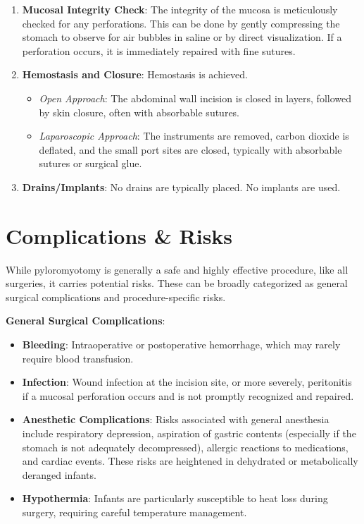 \begin{enumerate}
  \item \textbf{Mucosal Integrity Check}: The integrity of the mucosa is meticulously checked for any perforations. This can be done by gently compressing the stomach to observe for air bubbles in saline or by direct visualization. If a perforation occurs, it is immediately repaired with fine sutures.
  \item \textbf{Hemostasis and Closure}: Hemostasis is achieved.
    \begin{itemize}
      \item \textit{Open Approach}: The abdominal wall incision is closed in layers, followed by skin closure, often with absorbable sutures.
      \item \textit{Laparoscopic Approach}: The instruments are removed, carbon dioxide is deflated, and the small port sites are closed, typically with absorbable sutures or surgical glue.
    \end{itemize}
  \item \textbf{Drains/Implants}: No drains are typically placed. No implants are used.
\end{enumerate}

\section*{Complications \& Risks}
While pyloromyotomy is generally a safe and highly effective procedure, like all surgeries, it carries potential risks. These can be broadly categorized as general surgical complications and procedure-specific risks.

\textbf{General Surgical Complications}:
\begin{itemize}
  \item \textbf{Bleeding}: Intraoperative or postoperative hemorrhage, which may rarely require blood transfusion.
  \item \textbf{Infection}: Wound infection at the incision site, or more severely, peritonitis if a mucosal perforation occurs and is not promptly recognized and repaired.
  \item \textbf{Anesthetic Complications}: Risks associated with general anesthesia include respiratory depression, aspiration of gastric contents (especially if the stomach is not adequately decompressed), allergic reactions to medications, and cardiac events. These risks are heightened in dehydrated or metabolically deranged infants.
  \item \textbf{Hypothermia}: Infants are particularly susceptible to heat loss during surgery, requiring careful temperature management.
\end{itemize}

